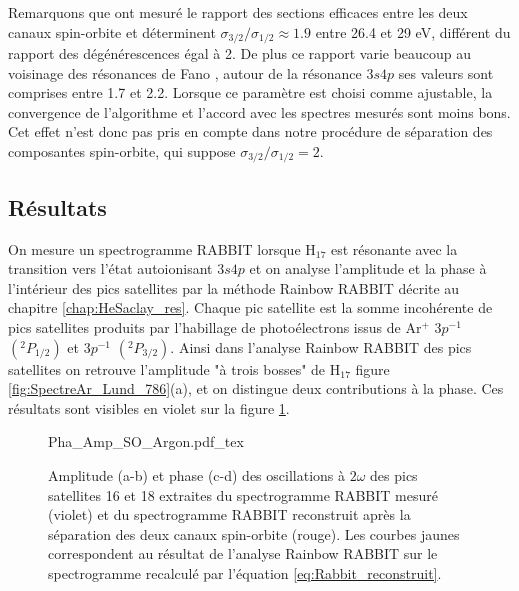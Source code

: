 Remarquons que  ont mesuré le rapport des sections efficaces entre les deux canaux spin-orbite et déterminent $\sigma_{3/2}/\sigma_{1/2} \approx 1.9$ entre 26.4 et 29 eV, différent du rapport des dégénérescences égal à 2. De plus ce rapport varie beaucoup au voisinage des résonances de Fano , autour de la résonance $3s4p$ ses valeurs sont comprises entre 1.7 et 2.2. Lorsque ce paramètre est choisi comme ajustable, la convergence de l'algorithme et l'accord avec les spectres mesurés sont moins bons. Cet effet n'est donc pas pris en compte dans notre procédure de séparation des composantes spin-orbite, qui suppose $\sigma_{3/2}/\sigma_{1/2} = 2$. 

\subsection{Résultats}
On mesure un spectrogramme RABBIT lorsque H$_{17}$ est résonante avec la transition vers l'état autoionisant $3s4p$ et on analyse l'amplitude et la phase à l'intérieur des pics satellites par la méthode Rainbow RABBIT décrite au chapitre \ref{chap:HeSaclay_res}. Chaque pic satellite est la somme incohérente de pics satellites produits par l'habillage de photoélectrons issus de Ar$^+$ $3p^{-1}$ $(^{2}P_{1/2})$ et $3p^{-1}$ $(^{2}P_{3/2})$. Ainsi dans l'analyse Rainbow RABBIT des pics satellites on retrouve l'amplitude "à trois bosses" de H$_{17}$ figure \ref{fig:SpectreAr_Lund_786}(a), et on distingue deux contributions à la phase. Ces résultats sont visibles en violet sur la figure \ref{fig:Pha_Amp_SO_Argon}.

\begin{figure}[ht]
\centering
\def\svgwidth{1\textwidth}
{Pha_Amp_SO_Argon.pdf_tex}
\caption{Amplitude (a-b) et phase (c-d) des oscillations à $2\omega$ des pics satellites 16 et 18 extraites du spectrogramme RABBIT mesuré (violet) et du spectrogramme RABBIT reconstruit après la séparation des deux canaux spin-orbite (rouge). Les courbes jaunes correspondent au résultat de l'analyse Rainbow RABBIT sur le spectrogramme recalculé par l'équation \ref{eq:Rabbit_reconstruit}.}
\label{fig:Pha_Amp_SO_Argon}
\end{figure}


